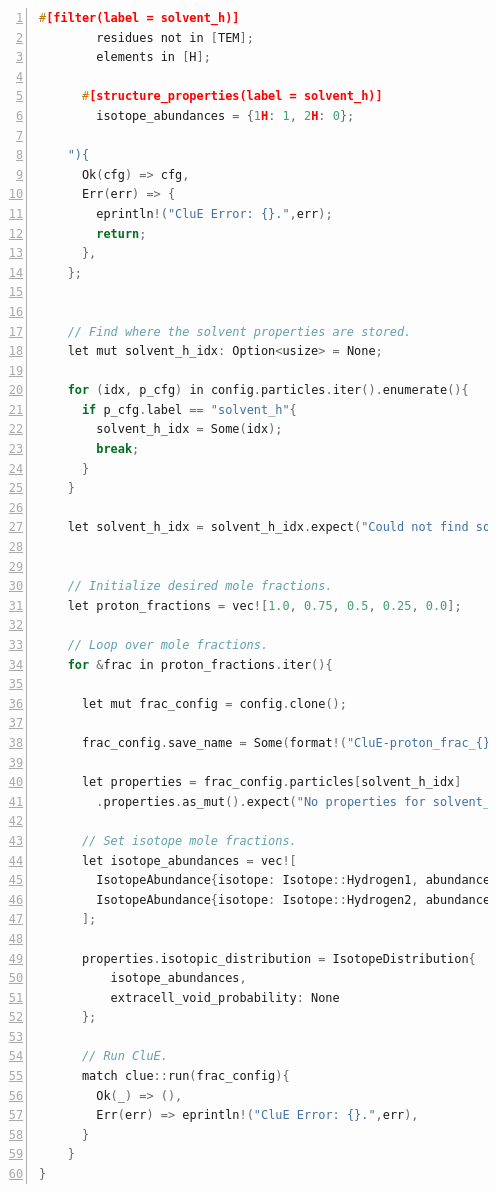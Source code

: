 \documentclass{book}
\begin{document}
\begin{lstlisting}[frame=single,numbers=left,language=c]
      #[filter(label = solvent_h)]
        residues not in [TEM];
        elements in [H];

      #[structure_properties(label = solvent_h)]
        isotope_abundances = {1H: 1, 2H: 0};

    "){
      Ok(cfg) => cfg,
      Err(err) => {
        eprintln!("CluE Error: {}.",err);
        return;
      },
    };

 
    // Find where the solvent properties are stored.
    let mut solvent_h_idx: Option<usize> = None;

    for (idx, p_cfg) in config.particles.iter().enumerate(){
      if p_cfg.label == "solvent_h"{
        solvent_h_idx = Some(idx);
        break;
      }
    }

    let solvent_h_idx = solvent_h_idx.expect("Could not find solvent_h_idx.");


    // Initialize desired mole fractions.
    let proton_fractions = vec![1.0, 0.75, 0.5, 0.25, 0.0];

    // Loop over mole fractions.
    for &frac in proton_fractions.iter(){
      
      let mut frac_config = config.clone();

      frac_config.save_name = Some(format!("CluE-proton_frac_{}",frac));

      let properties = frac_config.particles[solvent_h_idx]
        .properties.as_mut().expect("No properties for solvent_h");

      // Set isotope mole fractions.
      let isotope_abundances = vec![
        IsotopeAbundance{isotope: Isotope::Hydrogen1, abundance: frac},
        IsotopeAbundance{isotope: Isotope::Hydrogen2, abundance: 1.0 - frac},
      ];

      properties.isotopic_distribution = IsotopeDistribution{
          isotope_abundances,
          extracell_void_probability: None
      };

      // Run CluE.
      match clue::run(frac_config){
        Ok(_) => (),
        Err(err) => eprintln!("CluE Error: {}.",err),
      }
    }
}
\end{lstlisting}
%
\end{document}
